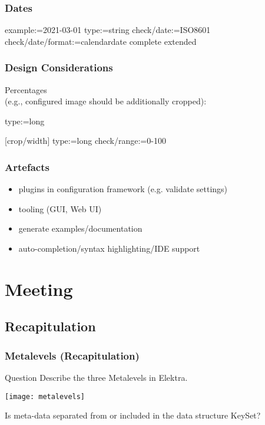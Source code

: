 \begin{frame}[fragile]
	\frametitle{Dates}
	\small
	\begin{code}[morekeywords={type,date,format,example},gobble=4]
	[mydate]
	example:=2021-03-01
	type:=string
	check/date:=ISO8601
	check/date/format:=calendardate complete extended
	\end{code}
\end{frame}

\begin{frame}[fragile]
	\frametitle{Design Considerations}
	Percentages
	\\ (e.g., configured image should be additionally cropped):
	\begin{code}
	type:=long

	[crop/width]
	type:=long
	check/range:=0-100
	\end{code}
\end{frame}

\begin{frame}
	\frametitle{Artefacts}
	\begin{itemize}
	\item plugins in configuration framework (e.g. validate settings)
	\item tooling (GUI, Web UI)
	\item generate examples/documentation
	\item auto-completion/syntax highlighting/IDE support
	\end{itemize}
\end{frame}




\section{Meeting}
\subsection{Recapitulation}

\begin{frame}
	\frametitle{Metalevels (Recapitulation)}
	\begin{alertblock}{Question}
	Describe the three Metalevels in Elektra.
	\end{alertblock}

	\pause
	\texttt{[image: metalevels]}
\end{frame}

\begin{assignment}
	\begin{task}
	Is meta-data separated from or included in the data structure KeySet?
	\end{task}
\end{assignment}

